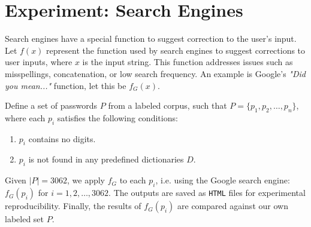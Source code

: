 \section{Experiment: Search Engines}
Search engines have a special function to suggest correction to the user's input. Let \( f(x) \) represent the function used by search engines to suggest corrections to user inputs, where \( x \) is the input string. This function addresses issues such as misspellings, concatenation, or low search frequency. An example is Google's \textit{"Did you mean..."} function, let this be $f_G(x)$.

Define a set of passwords \( P \) from a labeled corpus, such that \( P = \{ p_1, p_2, \ldots, p_n \} \), where each \( p_i \) satisfies the following conditions:
\begin{enumerate}
    \item \( p_i \) contains no digits.
    \item \( p_i \) is not found in any predefined dictionaries \( D \).
\end{enumerate}

Given \( |P| = 3062 \), we apply \( f_G \) to each \( p_i \), i.e. using the Google search engine: \( f_G(p_i) \) for \( i = 1, 2, \ldots, 3062 \). The outputs are saved as \texttt{HTML} files for experimental reproducibility. Finally, the results of \( f_G(p_i) \) are compared against our own labeled set \( P \).
